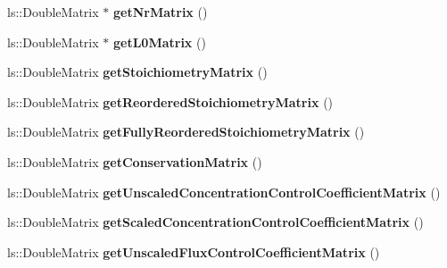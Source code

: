 \begin{DoxyCompactItemize}
\item 
\hypertarget{classrr_1_1_road_runner_ab4a40675344ec66d4756cea8dd0bb655}{ls\-::\-Double\-Matrix $\ast$ {\bfseries get\-Nr\-Matrix} ()}\label{classrr_1_1_road_runner_ab4a40675344ec66d4756cea8dd0bb655}

\item 
\hypertarget{classrr_1_1_road_runner_aa973f431635e09699b548ccbc584588b}{ls\-::\-Double\-Matrix $\ast$ {\bfseries get\-L0\-Matrix} ()}\label{classrr_1_1_road_runner_aa973f431635e09699b548ccbc584588b}

\item 
\hypertarget{classrr_1_1_road_runner_ae14f16f6d85d11d051b58643961cbc78}{ls\-::\-Double\-Matrix {\bfseries get\-Stoichiometry\-Matrix} ()}\label{classrr_1_1_road_runner_ae14f16f6d85d11d051b58643961cbc78}

\item 
\hypertarget{classrr_1_1_road_runner_a44dd3263687e6aa2900462ab29672ca3}{ls\-::\-Double\-Matrix {\bfseries get\-Reordered\-Stoichiometry\-Matrix} ()}\label{classrr_1_1_road_runner_a44dd3263687e6aa2900462ab29672ca3}

\item 
\hypertarget{classrr_1_1_road_runner_a75b8513f8024222edd4f31fbc7da9b24}{ls\-::\-Double\-Matrix {\bfseries get\-Fully\-Reordered\-Stoichiometry\-Matrix} ()}\label{classrr_1_1_road_runner_a75b8513f8024222edd4f31fbc7da9b24}

\item 
\hypertarget{classrr_1_1_road_runner_a6fa2cd47bfc3c40d74e775029dab6d4e}{ls\-::\-Double\-Matrix {\bfseries get\-Conservation\-Matrix} ()}\label{classrr_1_1_road_runner_a6fa2cd47bfc3c40d74e775029dab6d4e}

\item 
\hypertarget{classrr_1_1_road_runner_a1926e6503e60ebcc37ae339b597a25a3}{ls\-::\-Double\-Matrix {\bfseries get\-Unscaled\-Concentration\-Control\-Coefficient\-Matrix} ()}\label{classrr_1_1_road_runner_a1926e6503e60ebcc37ae339b597a25a3}

\item 
\hypertarget{classrr_1_1_road_runner_a1ed7c5519b10fea5a9e19eaab5f1fda7}{ls\-::\-Double\-Matrix {\bfseries get\-Scaled\-Concentration\-Control\-Coefficient\-Matrix} ()}\label{classrr_1_1_road_runner_a1ed7c5519b10fea5a9e19eaab5f1fda7}

\item 
\hypertarget{classrr_1_1_road_runner_ae8f9e20c1586d0a95f538d5c1bf301f2}{ls\-::\-Double\-Matrix {\bfseries get\-Unscaled\-Flux\-Control\-Coefficient\-Matrix} ()}\label{classrr_1_1_road_runner_ae8f9e20c1586d0a95f538d5c1bf301f2}


\end{DoxyCompactItemize}
